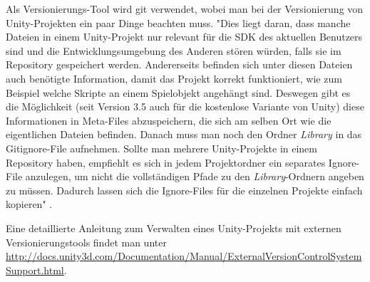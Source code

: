 Als Versionierungs-Tool wird git verwendet, wobei man bei der Versionierung von Unity-Projekten ein paar Dinge beachten muss. "Dies liegt daran, dass manche Dateien in einem Unity-Projekt nur relevant für die SDK des aktuellen Benutzers sind und die Entwicklungsumgebung des Anderen stören würden, falls sie im Repository gespeichert werden. Andererseits befinden sich unter diesen Dateien auch benötigte Information, damit das Projekt korrekt funktioniert, wie zum Beispiel welche Skripte an einem Spielobjekt angehängt sind. Deswegen gibt es die Möglichkeit (seit Version 3.5 auch für die kostenlose Variante von Unity) diese Informationen in Meta-Files abzuspeichern, die sich am selben Ort wie die eigentlichen Dateien befinden. Danach muss man noch den Ordner \textit{Library} in das Gitignore-File aufnehmen. Sollte man mehrere Unity-Projekte in einem Repository haben, empfiehlt es sich in jedem Projektordner ein separates Ignore-File anzulegen, um nicht die vollständigen Pfade zu den \textit{Library}-Ordnern angeben zu müssen. Dadurch lassen sich die Ignore-Files für die einzelnen Projekte einfach kopieren" \cite[Kapitel Entwicklungsumgebung]{TDGD13}.

Eine detaillierte Anleitung zum Verwalten eines Unity-Projekts mit externen Versionierungstools findet man unter \url{http://docs.unity3d.com/Documentation/Manual/ExternalVersionControlSystemSupport.html}.